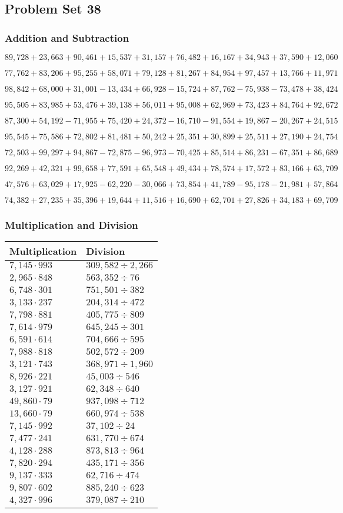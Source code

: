 \hypertarget{problem-set-38-4}{%
\subsection{Problem Set 38}\label{problem-set-38-4}}

\hypertarget{addition-and-subtraction-260}{%
\subsubsection{Addition and
Subtraction}\label{addition-and-subtraction-260}}

\(89,728+23,663+90,461+15,537+31,157+76,482+16,167+34,943+37,590+ 12,060\)

\(77,762+83,206+95,255+58,071+79,128+81,267+84,954+97,457+13,766+11,971\)

\(98,842+68,000+31,001-13,434+66,928-15,724+87,762-75,938-73,478+38,424\)

\(95,505+83,985+53,476+39,138+56,011+95,008+62,969+73,423+84,764+92,672\)

\(87,300+54,192-71,955+75,420+24,372-16,710-91,554+19,867-20,267+24,515\)

\(95,545+75,586+72,802+81,481+50,242+25,351+30,899+25,511+27,190+24,754\)

\(72,503+99,297+94,867-72,875-96,973-70,425+85,514+86,231-67,351+86,689\)

\(92,269+42,321+99,658+77,591+65,548+49,434+78,574+17,572+83,166+63,709\)

\(47,576+63,029+17,925-62,220-30,066+73,854+41,789-95,178-21,981+57,864\)

\(74,382+27,235+35,396+19,644+11,516+16,690+62,701+27,826+34,183+69,709\)

\hypertarget{multiplication-and-division-259}{%
\subsubsection{Multiplication and
Division}\label{multiplication-and-division-259}}

\begin{longtable}[]{@{}ll@{}}
\toprule
Multiplication & Division\tabularnewline
\midrule
\endhead
\(7,145\cdot993\) & \(309,582÷2,266\)\tabularnewline
\(2,965\cdot848\) & \(563,352 ÷76\)\tabularnewline
\(6,748\cdot301\) & \(751,501÷382\)\tabularnewline
\(3,133\cdot237\) & \(204,314÷472\)\tabularnewline
\(7,798\cdot881\) & \(405,775÷809\)\tabularnewline
\(7,614\cdot979\) & \(645,245÷301\)\tabularnewline
\(6,591\cdot614\) & \(704,666÷595\)\tabularnewline
\(7,988\cdot818\) & \(502,572÷209\)\tabularnewline
\(3,121\cdot743\) & \(368,971÷1,960\)\tabularnewline
\(8,926\cdot221\) & \(45,003÷546\)\tabularnewline
\(3,127\cdot921\) & \(62,348÷640\)\tabularnewline
\(49,860\cdot79\) & \(937,098÷712\)\tabularnewline
\(13,660\cdot79\) & \(660,974÷538\)\tabularnewline
\(7,145\cdot992\) & \(37,102÷24\)\tabularnewline
\(7,477\cdot241\) & \(631,770÷674\)\tabularnewline
\(4,128\cdot288\) & \(873,813÷964\)\tabularnewline
\(7,820\cdot294\) & \(435,171÷356\)\tabularnewline
\(9,137\cdot333\) & \(62,716÷474\)\tabularnewline
\(9,807\cdot602\) & \(885,240÷623\)\tabularnewline
\(4,327\cdot996\) & \(379,087÷210\)\tabularnewline
\bottomrule
\end{longtable}

